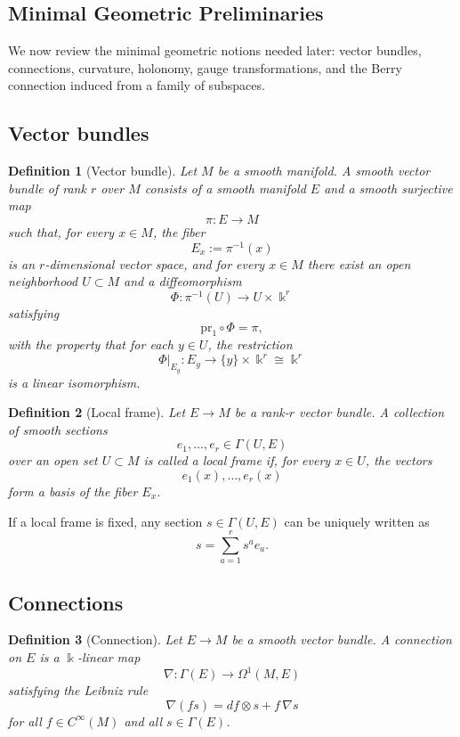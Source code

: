 \documentclass[pdflatex,sn-mathphys-num]{sn-jnl}%
\theoremstyle{thmstyleone}%
\theoremstyle{thmstyletwo}%
\theoremstyle{thmstylethree}%
\newtheorem{definition}{Definition}%
\begin{document}
\begin{appendices}

\section{Minimal Geometric Preliminaries}

We now review the minimal geometric notions needed later: vector bundles, connections, curvature, holonomy, gauge transformations, and the Berry connection induced from a family of subspaces.

\subsection{Vector bundles}

\begin{definition}[Vector bundle]
Let $M$ be a smooth manifold. A smooth vector bundle of rank $r$ over $M$ consists of a smooth manifold $E$ and a smooth surjective map
\[
\pi:E\to M
\]
such that, for every $x\in M$, the fiber
\[
E_x:=\pi^{-1}(x)
\]
is an $r$-dimensional vector space, and for every $x\in M$ there exist an open neighborhood $U\subset M$ and a diffeomorphism
\[
\Phi:\pi^{-1}(U)\to U\times \Bbbk^r
\]
satisfying
\[
\mathrm{pr}_1\circ \Phi=\pi,
\]
with the property that for each $y\in U$, the restriction
\[
\Phi|_{E_y}:E_y\to \{y\}\times \Bbbk^r\cong \Bbbk^r
\]
is a linear isomorphism.
\end{definition}

\begin{definition}[Local frame]
Let $E\to M$ be a rank-$r$ vector bundle. A collection of smooth sections
\[
e_1,\dots,e_r\in \Gamma(U,E)
\]
over an open set $U\subset M$ is called a local frame if, for every $x\in U$, the vectors
\[
e_1(x),\dots,e_r(x)
\]
form a basis of the fiber $E_x$.
\end{definition}

If a local frame is fixed, any section $s\in \Gamma(U,E)$ can be uniquely written as
\[
s=\sum_{a=1}^r s^a e_a.
\]

\subsection{Connections}

\begin{definition}[Connection]
Let $E\to M$ be a smooth vector bundle. A connection on $E$ is a $\Bbbk$-linear map
\[
\nabla:\Gamma(E)\to \Omega^1(M,E)
\]
satisfying the Leibniz rule
\[
\nabla(fs)=df\otimes s+f\,\nabla s
\]
for all $f\in C^\infty(M)$ and all $s\in \Gamma(E)$.
\end{definition}


\end{appendices}
\end{document}
